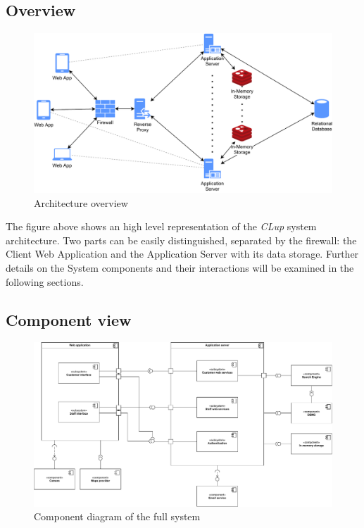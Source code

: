 \subsection{Overview}

\begin{figure}[H]
    \centering
    \includegraphics[width=.85\textwidth]{Images/overview.pdf}
    \caption{\label{fig:world_machine} Architecture overview}
\end{figure}
The figure above shows an high level representation of the \emph{CLup} system architecture.
Two parts can be easily distinguished, separated by the firewall: the Client Web Application and the Application Server with its data storage.
Further details on the System components and their interactions will be examined in the following sections.

\subsection{Component view}

\begin{figure}[H]
    \centering
    \includegraphics[width=.85\textwidth]{Images/component.pdf}
    \caption{\label{fig:component_diagram} Component diagram of the full system}
\end{figure}

